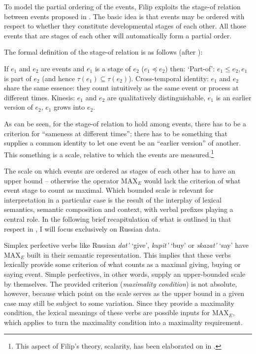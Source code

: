 \documentclass[output=paper,colorlinks,citecolor=brown]{langscibook}
\begin{document}
To model the partial ordering of the events, Filip exploits the stage-of relation between events proposed in \citet{Landman92}. The basic idea is that events may be ordered with respect to whether they constitute developmental stages of each other. All those events that are stages of each other will automatically form a partial order. 

The formal definition of the stage-of relation is as follows (after \citealt{FilipRothstein2006}):

\ea
If $e_1$ and $e_2$ are events and $e_1$ is a stage of $e_2$ ($e_1 \preccurlyeq e_2$) then:\label{rotfil}
\ea `Part-of': $e_1 \leq e_2, e_1$ is part of $e_2$ (and hence $\tau(e_1) \subseteq \tau(e_2)$).
\ex Cross-temporal identity: $e_1$ and $e_2$ share the same essence: they count intuitively as the same event or process at different times.
\ex Kinesis: $e_1$ and $e_2$ are qualitatively distinguishable, $e_1$ is an earlier version of $e_2$, $e_1$ grows into $e_2$.
\z
\z

\noindent As can be seen, for the stage-of relation to hold among events, there has to be a criterion for ``sameness at different times''; there has to be something that supplies a common identity to let one event be an ``earlier version'' of another. This something is a scale, relative to which the events are measured.\footnote{This aspect of Filip's theory, scalarity, has been elaborated on in \citet{Kagan12, Kagan15}.}

The scale on which events are ordered as stages of each other has to have an upper bound -- otherwise the operator MAX$_E$ would lack the criterion of what event stage to count as maximal.
Which bounded scale is relevant for interpretation in a particular case is the result of the interplay of lexical semantics, semantic composition and context, with verbal prefixes playing a central role.
In the following brief recapitulation of what is 
outlined in that respect in \citet{Filip2008}, I will focus exclusively on Russian data.

Simplex perfective verbs like Russian \textit{dat'} `give', \textit{kupit'} `buy' or \textit{skazat'} `say' have MAX$_E$ built in their semantic representation. This implies that these verbs lexically provide some criterion of what counts as a maximal giving, buying or saying event. Simple perfectives, in other words, supply an upper-bounded scale by themselves. The provided criterion 
(\textit{maximality condition}) is not absolute, however, because which point on the scale serves as the upper bound in a given case may still be subject to some variation. Since they provide a maximality condition, the lexical meanings of these verbs are possible inputs for MAX$_E$, which applies to turn the maximality condition into a maximality requirement.
\end{document}
